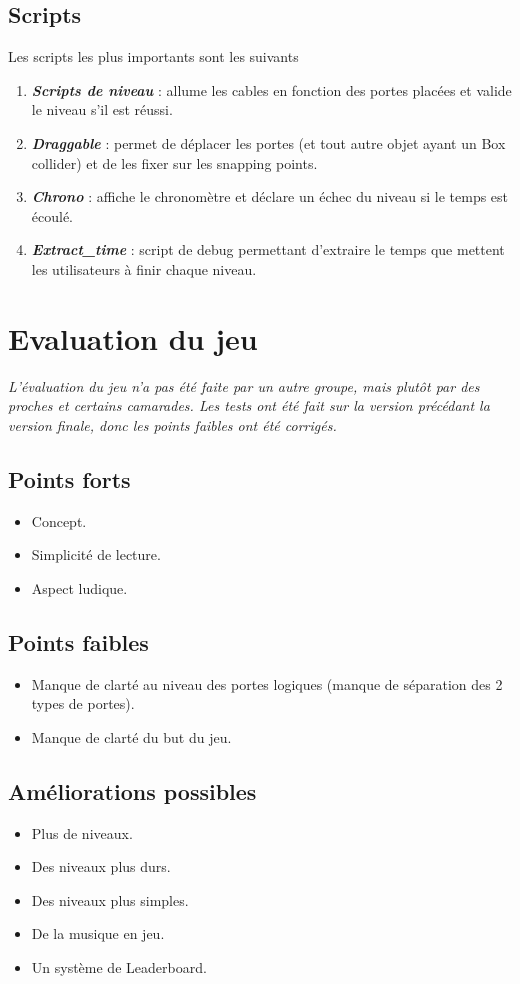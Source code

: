 \documentclass{article}
\newcommand{\ib}[1]{\textbf{\textit{#1}}}
\begin{document}
    \subsection{Scripts}
    \noindent
    Les scripts les plus importants sont les suivants
    \begin{enumerate}
        \item \ib{Scripts de niveau} : allume les cables en fonction des portes placées et valide le niveau s'il est réussi.
        \item \ib{Draggable} : permet de déplacer les portes (et tout autre objet ayant un Box collider) et de les fixer sur les snapping points.
        \item \ib{Chrono} : affiche le chronomètre et déclare un échec du niveau si le temps est écoulé.
        \item \ib{Extract\_time} : script de debug permettant d'extraire le temps que mettent les utilisateurs à finir chaque niveau.
    \end{enumerate}

\section{Evaluation du jeu}
\textit{L'évaluation du jeu n'a pas été faite par un autre groupe, mais plutôt par des proches et certains camarades. Les tests ont été fait sur la version précédant la version finale, donc les points faibles ont été corrigés.}
	\subsection{Points forts}
    \begin{itemize}
        \item Concept.
        \item Simplicité de lecture.
        \item Aspect ludique.
    \end{itemize}
	\subsection{Points faibles}
    \begin{itemize}
        \item Manque de clarté au niveau des portes logiques (manque de séparation des 2 types de portes).
        \item Manque de clarté du but du jeu.
    \end{itemize}
	\subsection{Améliorations possibles}
    \begin{itemize}
        \item Plus de niveaux.
        \item Des niveaux plus durs.
        \item Des niveaux plus simples.
        \item De la musique en jeu.
        \item Un système de Leaderboard.
    \end{itemize}
\end{document}
